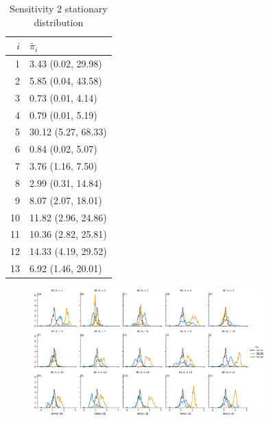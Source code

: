 \begin{table}
 \centering
 \caption{Sensitivity 2 stationary distribution}
 \label{tab:sens_2_stat_dist}
 \begin{tabular}{rl}
 \toprule
 $i$ & $\tilde{\pi_{i}}$ \\
 \midrule
 1 & 3.43 (0.02, 29.98) \\
 2 & 5.85 (0.04, 43.58) \\
 3 & 0.73 (0.01, 4.14) \\
 4 & 0.79 (0.01, 5.19) \\
 5 & 30.12 (5.27, 68.33) \\
 6 & 0.84 (0.02, 5.07) \\
 7 & 3.76 (1.16, 7.50) \\
 8 & 2.99 (0.31, 14.84) \\
 9 & 8.07 (2.07, 18.01) \\
 10 & 11.82 (2.96, 24.86) \\
 11 & 10.36 (2.82, 25.81) \\
 12 & 14.33 (4.19, 29.52) \\
 13 & 6.92 (1.46, 20.01) \\
 \bottomrule
 \end{tabular}
\end{table}

\begin{figure}
 \centering
 \label{fig:sens_2_overlap}
 \includegraphics[width=0.8\textwidth]{chapters/aadh/figures/sensitivity_2_5_overlap.png}

\end{figure}




